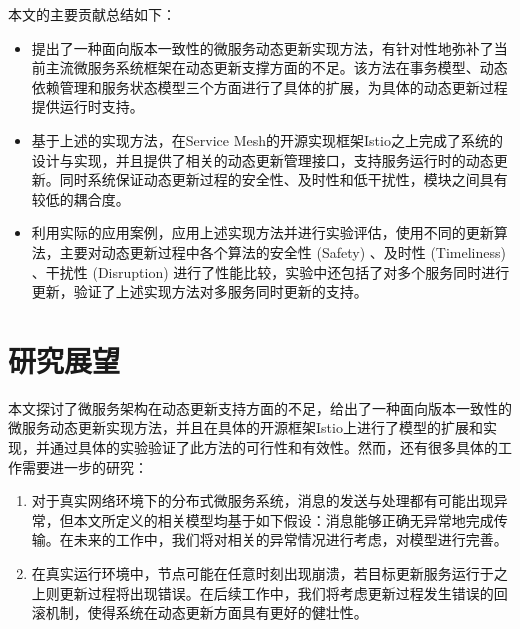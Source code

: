 \documentclass[macfonts,master]{njuthesis}
\begin{document}
本文的主要贡献总结如下：

\begin{itemize}
	\item 提出了一种面向版本一致性的微服务动态更新实现方法，有针对性地弥补了当前主流微服务系统框架在动态更新支撑方面的不足。该方法在事务模型、动态依赖管理和服务状态模型三个方面进行了具体的扩展，为具体的动态更新过程提供运行时支持。
	\item 基于上述的实现方法，在Service Mesh的开源实现框架Istio之上完成了系统的设计与实现，并且提供了相关的动态更新管理接口，支持服务运行时的动态更新。同时系统保证动态更新过程的安全性、及时性和低干扰性，模块之间具有较低的耦合度。
	\item 利用实际的应用案例，应用上述实现方法并进行实验评估，使用不同的更新算法，主要对动态更新过程中各个算法的安全性 (Safety) 、及时性 (Timeliness) 、干扰性 (Disruption) 进行了性能比较，实验中还包括了对多个服务同时进行更新，验证了上述实现方法对多服务同时更新的支持。
\end{itemize}

\section{研究展望}
本文探讨了微服务架构在动态更新支持方面的不足，给出了一种面向版本一致性的微服务动态更新实现方法，并且在具体的开源框架Istio上进行了模型的扩展和实现，并通过具体的实验验证了此方法的可行性和有效性。然而，还有很多具体的工作需要进一步的研究：

\begin{enumerate}
	\item 对于真实网络环境下的分布式微服务系统，消息的发送与处理都有可能出现异常，但本文所定义的相关模型均基于如下假设：消息能够正确无异常地完成传输。在未来的工作中，我们将对相关的异常情况进行考虑，对模型进行完善。
	\item 在真实运行环境中，节点可能在任意时刻出现崩溃，若目标更新服务运行于之上则更新过程将出现错误。在后续工作中，我们将考虑更新过程发生错误的回滚机制，使得系统在动态更新方面具有更好的健壮性。
\end{enumerate}
\end{document}
